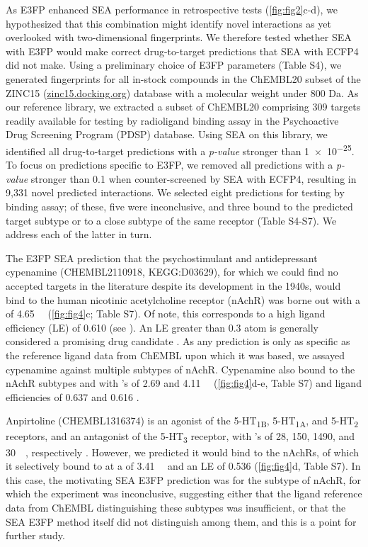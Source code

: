 \documentclass[../../main.tex]{subfiles}
\begin{document}
\begin{refsection}
	As E3FP enhanced SEA performance in retrospective tests (\cref{fig:fig2}c-d), we hypothesized that this combination might identify novel interactions as yet overlooked with two-dimensional fingerprints.
	We therefore tested whether SEA with E3FP would make correct drug-to-target predictions that SEA with ECFP4 did not make.
	Using a preliminary choice of E3FP parameters (Table S4), we generated fingerprints for all in-stock compounds in the ChEMBL20 subset of the ZINC15 (\url{zinc15.docking.org}) database with a molecular weight under 800 Da.
	As our reference library, we extracted a subset of ChEMBL20 comprising 309 targets readily available for testing by radioligand binding assay in the Psychoactive Drug Screening Program (PDSP) \supercite{besnard_2012} database.
	Using SEA on this library, we identified all drug-to-target predictions with a  \emph{p-value} stronger than \num{1e-25}.
	To focus on predictions specific to E3FP, we removed all predictions with a  \emph{p-value} stronger than 0.1 when counter-screened by SEA with ECFP4, resulting in 9,331 novel predicted interactions.
	We selected eight predictions for testing by binding assay; of these, five were inconclusive, and three bound to the predicted target subtype or to a close subtype of the same receptor (Table S4-S7).
	We address each of the latter in turn.

	The E3FP SEA prediction that the psychostimulant and antidepressant  \supercite{kanehisa_2017,kanehisa_2016,kanehisa_2000} cypenamine (CHEMBL2110918, KEGG:D03629), for which we could find no accepted targets in the literature despite its development in the 1940s, would bind to the human nicotinic acetylcholine receptor (nAchR)  was borne out with a  \Ki{} of \SI{4.65}{\micro\molar} (\cref{fig:fig4}c; Table S7).
	Of note, this corresponds to a high ligand efficiency (LE) of 0.610  \LEunit{} (see ).
	An LE greater than 0.3  \LEunit{} atom is generally considered a promising drug candidate  \supercite{hopkins_2014}.
	As any prediction is only as specific as the reference ligand data from ChEMBL upon which it was based, we assayed cypenamine against multiple subtypes of nAchR.
	Cypenamine also bound to the nAchR subtypes  and  with \Ki's of 2.69 and \SI{4.11}{\micro\molar} (\cref{fig:fig4}d-e, Table S7) and ligand efficiencies of 0.637 and 0.616 \LEunit{}.

	Anpirtoline (CHEMBL1316374) is an agonist of the 5-HT\textsubscript{1B}, 5-HT\textsubscript{1A}, and 5-HT\textsubscript{2} receptors, and an antagonist of the 5-HT\textsubscript{3} receptor, with  \Ki's of 28, 150, 1490, and \SI{30}{\nano\molar}, respectively  \supercite{schlicker_1992,metzenauer_1992}.
	However, we predicted it would bind to the nAchRs, of which it selectively bound to  at a  \Ki{} of \SI{3.41}{\micro\molar} and an LE of 0.536 \LEunit{} (\cref{fig:fig4}d, Table S7).
	In this case, the motivating SEA E3FP prediction was for the  subtype of nAchR, for which the experiment was inconclusive, suggesting either that the ligand reference data from ChEMBL distinguishing these subtypes was insufficient, or that the SEA E3FP method itself did not distinguish among them, and this is a point for further study.


\end{refsection}
\end{document}
